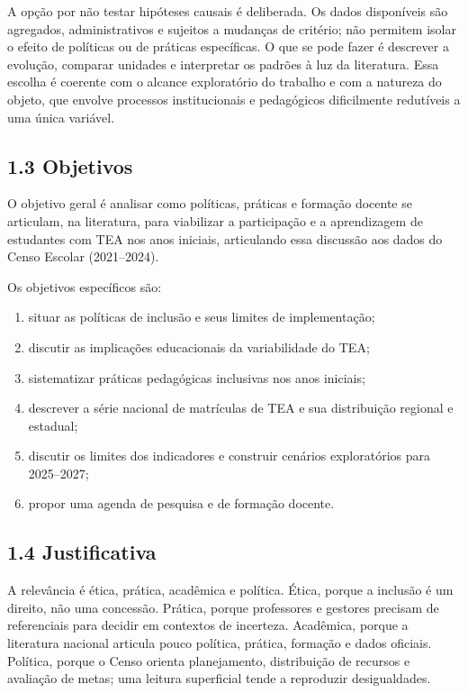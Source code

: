 A opção por não testar hipóteses causais é deliberada. Os dados
disponíveis são agregados, administrativos e sujeitos a mudanças de
critério; não permitem isolar o efeito de políticas ou de práticas
específicas. O que se pode fazer é descrever a evolução, comparar
unidades e interpretar os padrões à luz da literatura. Essa escolha é
coerente com o alcance exploratório do trabalho e com a natureza do
objeto, que envolve processos institucionais e pedagógicos dificilmente
redutíveis a uma única variável.

\subsection{1.3 Objetivos}\label{objetivos}

O objetivo geral é analisar como políticas, práticas e formação docente
se articulam, na literatura, para viabilizar a participação e a
aprendizagem de estudantes com TEA nos anos iniciais, articulando essa
discussão aos dados do Censo Escolar (2021--2024).

Os objetivos específicos são:

\begin{enumerate}
\def\labelenumi{\alph{enumi})}
\item
  situar as políticas de inclusão e seus limites de implementação;
\item
  discutir as implicações educacionais da variabilidade do TEA;
\item
  sistematizar práticas pedagógicas inclusivas nos anos iniciais;
\item
  descrever a série nacional de matrículas de TEA e sua distribuição
  regional e estadual;
\item
  discutir os limites dos indicadores e construir cenários exploratórios
  para 2025--2027;
\item
  propor uma agenda de pesquisa e de formação docente.
\end{enumerate}

\subsection{1.4 Justificativa}\label{justificativa}

A relevância é ética, prática, acadêmica e política. Ética, porque a
inclusão é um direito, não uma concessão. Prática, porque professores e
gestores precisam de referenciais para decidir em contextos de
incerteza. Acadêmica, porque a literatura nacional articula pouco
política, prática, formação e dados oficiais. Política, porque o Censo
orienta planejamento, distribuição de recursos e avaliação de metas; uma
leitura superficial tende a reproduzir desigualdades.

